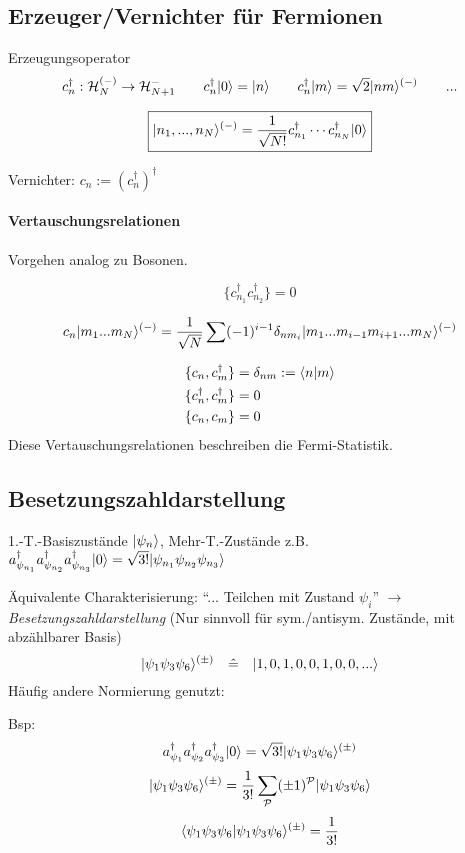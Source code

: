 \documentclass[11pt,a4paper]{report}
\begin{document}
\subsection{Erzeuger/Vernichter für Fermionen}

\newcommand{\createf}[1]{c^\dagger_{#1}}
\newcommand{\destroyf}[1]{c_{#1}}

Erzeugungsoperator
$$\createf{n}:\hil_N^{(-)}\rightarrow \hil_{N+1}^{-}\qquad \createf{n}\ket{0} = \ket{n}\qquad \createf{n}\ket{m} = \sqrt{2}\ket{nm}^{(-)}\qquad ...$$

$$\boxed{\ket{n_1,...,n_N}^{(-)} = \frac{1}{\sqrt{N!}}\createf{n_1}\cdots \createf{n_N} \ket{0}}$$

Vernichter: $\destroyf{n} := (\createf{n})^\dagger$\par 

\paragraph{Vertauschungsrelationen} Vorgehen analog zu Bosonen.

$$\{\createf{n_1}\createf{n_2}\} = 0$$

$$c_n|m_1...m_N\rangle^{(-)} = \frac{1}{\sqrt{N}}\sum (-1)^{i-1}\delta_{nm_i}|m_1...m_{i-1}m_{i+1}...m_N\rangle^{(-)}$$

\begin{align*}
\{\destroyf{n},\createf{m}\}&=\delta_{nm} :=\sprod{n}{m} \\
\{\createf{n},\createf{m}\} &= 0 \\
\{\destroyf{n},\destroyf{m}\} &= 0
\end{align*}
Diese Vertauschungsrelationen beschreiben die Fermi-Statistik.

\subsection{Besetzungszahldarstellung}

1.-T.-Basiszustände $|\psi_n\rangle$, Mehr-T.-Zustände z.B. $a_{\psi_{n_1}}^\dagger a_{\psi_{n_2}}^\dagger a_{\psi_{n_3}}^\dagger|0\rangle = \sqrt{3!}|\psi_{n_1}\psi_{n_2}\psi_{n_3}\rangle$\par 
Äquivalente Charakterisierung: ``... Teilchen mit Zustand $\psi_i$'' $\rightarrow$ \textit{Besetzungszahldarstellung} (Nur sinnvoll für sym./antisym. Zustände, mit abzählbarer Basis)
$$|\psi_1\psi_3\psi_6\rangle^{(\pm)} \quad \hat{=} \quad |1,0,1,0,0,1,0,0,...\rangle$$
Häufig andere Normierung genutzt:\par 
Bsp: 
$$a_{\psi_{1}}^\dagger a_{\psi_{2}}^\dagger a_{\psi_{3}}^\dagger|0\rangle = \sqrt{3!}|\psi_1\psi_3\psi_6\rangle^{(\pm)}$$
$$|\psi_1\psi_3\psi_6\rangle^{(\pm)}=\frac{1}{3!}\sum_{\mathcal{P}}(\pm 1)^\mathcal{P}|\psi_1\psi_3\psi_6\rangle$$
$$\langle \psi_1\psi_3\psi_6 | \psi_1\psi_3\psi_6 \rangle^{(\pm )} = \frac{1}{3!}$$
\end{document}
